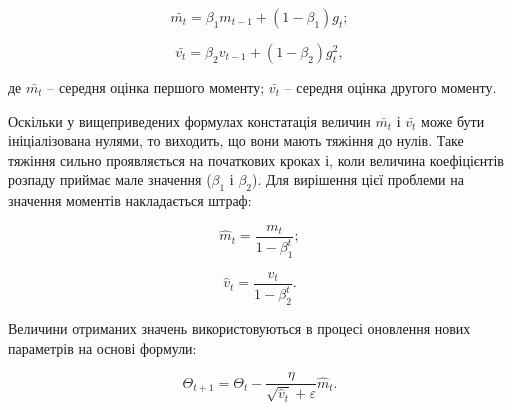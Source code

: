 \[
\bar{m_t}=\beta_1m_{t-1}+(1-\beta_1)g_t;
\]

\[
\bar{v_t}=\beta_2v_{t-1}+(1-\beta_2)g^2_t,
\]

\noindent
де $\bar{m_t}$ – середня оцінка першого моменту; $\bar{v_t}$ – середня оцінка другого моменту.

Оскільки у вищеприведених формулах констатація величин $\bar{m_t}$ і $\bar{v_t}$ може бути ініціалізована нулями, то виходить, що вони мають тяжіння до нулів. Таке тяжіння сильно проявляється на початкових кроках і, коли величина коефіцієнтів розпаду приймає мале значення ($\beta_1$ і $\beta_2$). Для вирішення цієї проблеми на значення моментів накладається штраф:

\[
\hat{m}_t=\frac{m_t}{1-\beta_1^t};
\]

\[
\hat{v}_t=\frac{v_t}{1-\beta_2^t}.
\]

Величини отриманих значень використовуються в процесі оновлення нових параметрів на основі формули:

\[
\Theta_{t+1}=\Theta_t-\frac{\eta}{\sqrt{\hat{v}_t}+\varepsilon}\hat{m}_t.
\]

